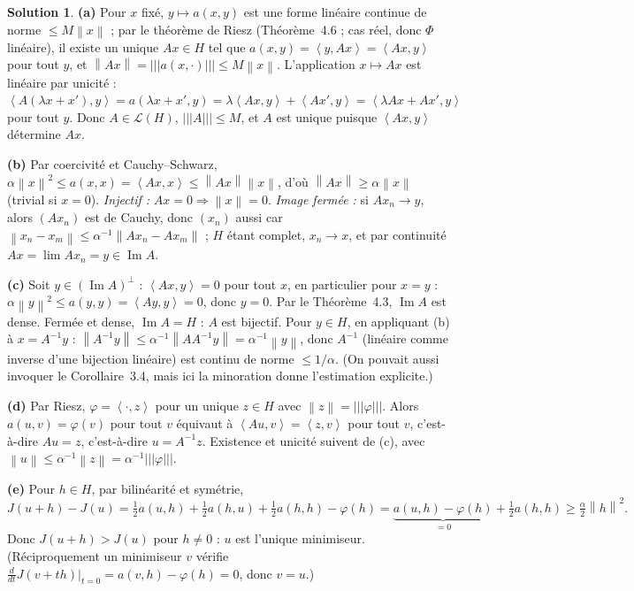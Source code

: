 \documentclass[11pt,a4paper]{article}
\newcommand{\norm}[1]{\left\|#1\right\|}
\newcommand{\opnorm}[1]{|\!|\!|#1|\!|\!|}
\newcommand{\ps}[2]{\left\langle #1,#2\right\rangle}
\newcommand{\Lc}{\mathcal{L}}
\newcommand{\ie}{c'est-à-dire}
\DeclareMathOperator{\Ima}{Im}
\theoremstyle{definition}
\newtheorem*{solution}{Solution}
\begin{document}
\begin{solution}
\noindent\textbf{(a)} Pour $x$ fixé, $y\mapsto a(x,y)$ est une forme linéaire continue de norme $\le M\norm x$ ; par le théorème de Riesz (Théorème~4.6 ; cas réel, donc $\Phi$ linéaire), il existe un unique $Ax\in H$ tel que $a(x,y)=\ps y{Ax}=\ps{Ax}y$ pour tout $y$, et $\norm{Ax}=\opnorm{a(x,\cdot)}\le M\norm x$. L'application $x\mapsto Ax$ est linéaire par unicité : $\ps{A(\lambda x+x')}y=a(\lambda x+x',y)=\lambda\ps{Ax}y+\ps{Ax'}y=\ps{\lambda Ax+Ax'}y$ pour tout $y$. Donc $A\in\Lc(H)$, $\opnorm A\le M$, et $A$ est unique puisque $\ps{Ax}y$ détermine $Ax$.

\medskip
\noindent\textbf{(b)} Par coercivité et Cauchy--Schwarz, $\alpha\norm x^2\le a(x,x)=\ps{Ax}x\le\norm{Ax}\norm x$, d'où $\norm{Ax}\ge\alpha\norm x$ (trivial si $x=0$). \emph{Injectif :} $Ax=0\Rightarrow\norm x=0$. \emph{Image fermée :} si $Ax_n\to y$, alors $(Ax_n)$ est de Cauchy, donc $(x_n)$ aussi car $\norm{x_n-x_m}\le\alpha^{-1}\norm{Ax_n-Ax_m}$ ; $H$ étant complet, $x_n\to x$, et par continuité $Ax=\lim Ax_n=y\in\Ima A$.

\medskip
\noindent\textbf{(c)} Soit $y\in(\Ima A)^\perp$ : $\ps{Ax}y=0$ pour tout $x$, en particulier pour $x=y$ : $\alpha\norm y^2\le a(y,y)=\ps{Ay}y=0$, donc $y=0$. Par le Théorème~4.3, $\Ima A$ est dense. Fermée et dense, $\Ima A=H$ : $A$ est bijectif. Pour $y\in H$, en appliquant (b) à $x=A^{-1}y$ : $\norm{A^{-1}y}\le\alpha^{-1}\norm{AA^{-1}y}=\alpha^{-1}\norm y$, donc $A^{-1}$ (linéaire comme inverse d'une bijection linéaire) est continu de norme $\le1/\alpha$. (On pouvait aussi invoquer le Corollaire~3.4, mais ici la minoration donne l'estimation explicite.)

\medskip
\noindent\textbf{(d)} Par Riesz, $\varphi=\ps\cdot z$ pour un unique $z\in H$ avec $\norm z=\opnorm\varphi$. Alors $a(u,v)=\varphi(v)$ pour tout $v$ équivaut à $\ps{Au}v=\ps zv$ pour tout $v$, \ie{} $Au=z$, \ie{} $u=A^{-1}z$. Existence et unicité suivent de (c), avec $\norm u\le\alpha^{-1}\norm z=\alpha^{-1}\opnorm\varphi$.

\medskip
\noindent\textbf{(e)} Pour $h\in H$, par bilinéarité et symétrie,
\[
J(u+h)-J(u)=\tfrac12a(u,h)+\tfrac12a(h,u)+\tfrac12a(h,h)-\varphi(h)=\underbrace{a(u,h)-\varphi(h)}_{=0}+\tfrac12a(h,h)\ge\tfrac\alpha2\norm h^2 .
\]
Donc $J(u+h)>J(u)$ pour $h\ne0$ : $u$ est l'unique minimiseur. (Réciproquement un minimiseur $v$ vérifie $\frac{d}{dt}J(v+th)|_{t=0}=a(v,h)-\varphi(h)=0$, donc $v=u$.)


\end{solution}
\end{document}
